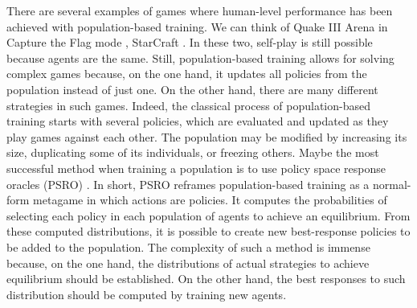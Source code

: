 There are several examples of games where human-level performance has been achieved with population-based training.
We can think of Quake III Arena in Capture the Flag mode \citep{jaderberg2019human}, StarCraft \citep{vinyals2019grandmaster}.
In these two, self-play is still possible because agents are the same.
Still, population-based training allows for solving complex games because, on the one hand, it updates all policies from the population instead of just one.
On the other hand, there are many different strategies in such games.
Indeed, the classical process of population-based training starts with several policies, which are evaluated and updated as they play games against each other.
The population may be modified by increasing its size, duplicating some of its individuals, or freezing others.
Maybe the most successful method when training a population is to use policy space response oracles (PSRO) \citep{NIPS2017_3323fe11, Muller2020A}.
In short, PSRO reframes population-based training as a normal-form metagame in which actions are policies.
It computes the probabilities of selecting each policy in each population of agents to achieve an equilibrium.
From these computed distributions, it is possible to create new best-response policies to be added to the population.
The complexity of such a method is immense because, on the one hand, the distributions of actual strategies to achieve equilibrium should be established.
On the other hand, the best responses to such distribution should be computed by training new agents.